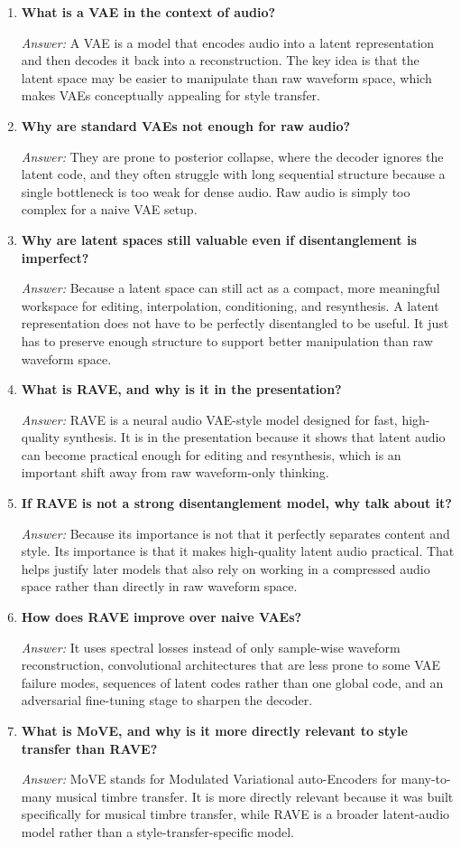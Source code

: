 \documentclass[11pt]{article}
\newcommand{\qa}[2]{
\item \textbf{#1}

\textit{Answer:} #2
}
\begin{document}
\begin{enumerate}[start=29]
\qa{What is a VAE in the context of audio?}{
A VAE is a model that encodes audio into a latent representation and then decodes it back into a reconstruction. The key idea is that the latent space may be easier to manipulate than raw waveform space, which makes VAEs conceptually appealing for style transfer.
}

\qa{Why are standard VAEs not enough for raw audio?}{
They are prone to posterior collapse, where the decoder ignores the latent code, and they often struggle with long sequential structure because a single bottleneck is too weak for dense audio. Raw audio is simply too complex for a naive VAE setup.
}

\qa{Why are latent spaces still valuable even if disentanglement is imperfect?}{
Because a latent space can still act as a compact, more meaningful workspace for editing, interpolation, conditioning, and resynthesis. A latent representation does not have to be perfectly disentangled to be useful. It just has to preserve enough structure to support better manipulation than raw waveform space.
}

\qa{What is RAVE, and why is it in the presentation?}{
RAVE is a neural audio VAE-style model designed for fast, high-quality synthesis. It is in the presentation because it shows that latent audio can become practical enough for editing and resynthesis, which is an important shift away from raw waveform-only thinking.
}

\qa{If RAVE is not a strong disentanglement model, why talk about it?}{
Because its importance is not that it perfectly separates content and style. Its importance is that it makes high-quality latent audio practical. That helps justify later models that also rely on working in a compressed audio space rather than directly in raw waveform space.
}

\qa{How does RAVE improve over naive VAEs?}{
It uses spectral losses instead of only sample-wise waveform reconstruction, convolutional architectures that are less prone to some VAE failure modes, sequences of latent codes rather than one global code, and an adversarial fine-tuning stage to sharpen the decoder.
}

\qa{What is MoVE, and why is it more directly relevant to style transfer than RAVE?}{
MoVE stands for Modulated Variational auto-Encoders for many-to-many musical timbre transfer. It is more directly relevant because it was built specifically for musical timbre transfer, while RAVE is a broader latent-audio model rather than a style-transfer-specific model.
}


\end{enumerate}
\end{document}
